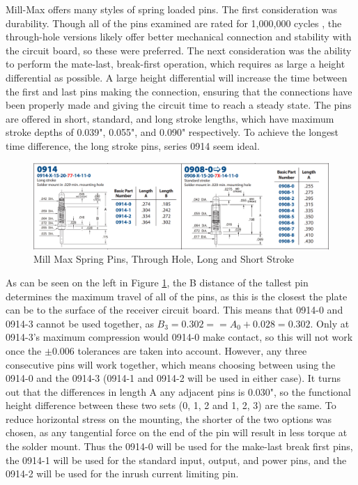 \documentclass{article}
\begin{document}
		Mill-Max offers many styles of spring loaded pins.  The first consideration was durability.  Though all of the pins examined are rated for 1,000,000 cycles \cite{MillMax_023}\cite{MillMax_025}, the through-hole versions likely offer better mechanical connection and stability with the circuit board, so these were preferred.  The next consideration was the ability to perform the mate-last, break-first operation, which requires as large a height differential as possible.  A large height differential will increase the time between the first and last pins making the connection, ensuring that the connections have been properly made and giving the circuit time to reach a steady state.  The pins are offered in short, standard, and long stroke lengths, which have maximum stroke depths of 0.039", 0.055", and 0.090" respectively. To achieve the longest time difference, the long stroke pins, series 0914 seem ideal.

		\begin{figure}
			\centering
			\includegraphics[width = \textwidth]{MillMaxSeries0914_0908.png}
			\caption{Mill Max Spring Pins, Through Hole, Long and Short Stroke}
			\label{fig:millmax0914_0908}
		\end{figure}

		As can be seen on the left in Figure \ref{fig:millmax0914_0908}, the B distance of the tallest pin determines the maximum travel of all of the pins, as this is the closest the plate can be to the surface of the receiver circuit board.  This means that 0914-0 and 0914-3 cannot be used together, as $B_3 = 0.302 == A_0 + 0.028 = 0.302$.  Only at 0914-3's maximum compression would 0914-0 make contact, so this will not work once the $\pm 0.006$ tolerances are taken into account.  However, any three consecutive pins will work together, which means choosing between using the 0914-0 and the 0914-3 (0914-1 and 0914-2 will be used in either case).  It turns out that the differences in length A any adjacent pins is 0.030", so the functional height difference between these two sets ({0, 1, 2} and {1, 2, 3}) are the same.  To reduce horizontal stress on the mounting, the shorter of the two options was chosen, as any tangential force on the end of the pin will result in less torque at the solder mount.  Thus the 0914-0 will be used for the make-last break first pins, the 0914-1 will be used for the standard input, output, and power pins, and the 0914-2 will be used for the inrush current limiting pin.
\end{document}
